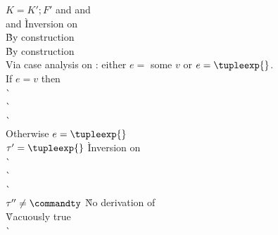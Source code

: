 \begin{description}
\begin{tabbing}
    $K = K';F'$ and  and  \\
      \hspace{1em} and  
      \` Inversion on  \\
     \` By construction \\
     \` By construction \\
    Via case analysis on : either $e = $ some $v$ or $e = \tupleexp{}$. \\
    If $e = v$ then \+ \\
        \`  \\
        \`  \\
        \`  \- \\
    Otherwise $e = \tupleexp{}$ \+ \\
      $\tau' = \tupleexp{}$
        \` Inversion on  \\
        \`  \\
        \`  \\
        \`  \- \\
    $\tau'' \not= \commandty$ \` No derivation of  \\
      \` Vacuously true \\
     \`  \\
  \end{tabbing}


\end{description}
